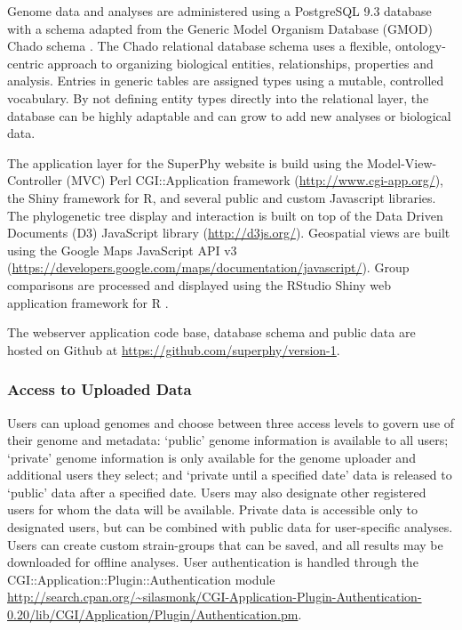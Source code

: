 \documentclass[doublespacing, linenumbers]{bmcart}
\begin{document}
Genome data and analyses are administered using a PostgreSQL 9.3 database with a schema adapted from the Generic Model Organism Database (GMOD) Chado schema \cite{mungall_chado_2007}. The Chado relational database schema uses a flexible, ontology-centric approach to organizing biological entities, relationships, properties and analysis. Entries in generic tables are assigned types using a mutable, controlled vocabulary. By not defining entity types directly into the relational layer, the database can be highly adaptable and can grow to add new analyses or biological data.

The application layer for the SuperPhy website is build using the Model-View-Controller (MVC) Perl CGI::Application framework (\url{http://www.cgi-app.org/}), the Shiny framework for R, and several public and custom Javascript libraries. The phylogenetic tree display and interaction is built on top of the Data Driven Documents (D3) JavaScript library (\url{http://d3js.org/}). Geospatial views are built using the Google Maps JavaScript API v3 (\url{https://developers.google.com/maps/documentation/javascript/}). Group comparisons are processed and displayed using the RStudio Shiny web application framework for R \cite{racine_rstudio:_2012}.

The webserver application code base, database schema and public data are hosted on Github at \url{https://github.com/superphy/version-1}.

\subsubsection{Access to Uploaded Data}
Users can upload genomes and choose between three access levels to govern use of their genome and metadata: `public' genome information is available to all users; `private' genome information is only available for the genome uploader and additional users they select; and `private until a specified date' data is released to `public' data after a specified date. Users may also designate other registered users for whom the data will be available. Private data is accessible only to designated users, but can be combined with public data for user-specific analyses. Users can create custom strain-groups that can be saved, and all results may be downloaded for offline analyses. User authentication is handled through the CGI::Application::Plugin::Authentication module \url{http://search.cpan.org/~silasmonk/CGI-Application-Plugin-Authentication-0.20/lib/CGI/Application/Plugin/Authentication.pm}. 
\end{document}
